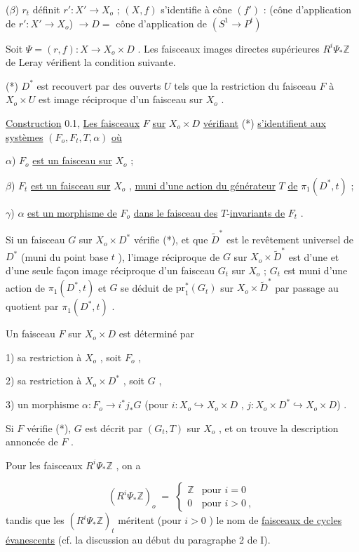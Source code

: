 ($\beta$) $r_t$ définit $r' : X' \longrightarrow X_o$ ; $(X, f)$ s'identifie à
cône $(f')$ : (cône d'application de $r' : X' \longrightarrow X_o$) $\longrightarrow D =$ cône d'application de $(S^1 \to P^t)$

Soit $\Psi = (r, f) : X \longrightarrow X_o \times D$ . Les faisceaux images directes supérieures $R^i \Psi_* \mathbb{Z}$ de Leray vérifient la condition suivante.

(*)  $D^*$ est recouvert par des ouverts $U$ tels que la restriction du faisceau $F$ à $X_o \times U$ est image réciproque d'un faisceau sur $X_o$ .

\underline{Construction} 0.1, \underline{Les faisceaux} $F$ \underline{sur} $X_o \times D$ \underline{vérifiant} (*) \underline{s'identifient aux systèmes} $(F_o, F_t, T, \alpha)$ \underline{où}

$\alpha$)  $F_o$  \underline{est un faisceau sur} $X_o$  ;

$\beta$)  $F_t$  \underline{est un faisceau sur} $X_o$  , \underline{muni d'une action du générateur} $T$ \underline{de} $\pi_1(D^*,t)$ ;

$\gamma$)  $\alpha$  \underline{est un morphisme de} $F_o$ \underline{dans le faisceau des} $T$-\underline{invariants de} $F_t$ .

Si un faisceau $G$ sur $X_o \times D^*$ vérifie (*), et que $\widetilde{D}^*$ est le revêtement universel de $D^*$ (muni du point base $t$ ), l'image réciproque de $G$ sur $X_o \times \widetilde{D}^*$ est d'une et d'une seule façon image réciproque d'un faisceau $G_t$ sur $X_o$  ; $G_t$ est muni d'une action de $\pi_1(D^*, t)$ et $G$ se déduit de $\mathrm{pr}_1^*(G_t)$ sur $X_o \times \widetilde{D}^*$ par passage au quotient par $\pi_1(D^*, t)$ .

Un faisceau $F$ sur $X_o \times D$ est déterminé par

1) sa restriction à $X_o$ , soit $F_o$ ,

2) sa restriction à $X_o \times D^*$ , soit $G$ ,

3) un morphisme $\alpha : F_o \longrightarrow i^*j_*G$ (pour $i : X_o \hookrightarrow X_o \times D$ , $j : X_o \times D^* \hookrightarrow X_o \times D$) .

Si $F$ vérifie (*), $G$ est décrit par $(G_t, T)$ sur $X_o$ , et on trouve la description annoncée de $F$ .

Pour les faisceaux $R^i \Psi_* \mathbb{Z}$ , on a

\begin{equation*}
(R^i \Psi_* \mathbb{Z})_o \;=\; \begin{cases} \mathbb{Z} & \text{pour } i = 0 \\ 0 & \text{pour } i > 0 \ , \end{cases}
\end{equation*}
tandis que les $(R^i \Psi_* \mathbb{Z} )_t$ méritent (pour $i > 0$ ) le nom de \underline{faisceaux de cycles évanescents} (cf. la discussion au début du paragraphe 2 de I).


